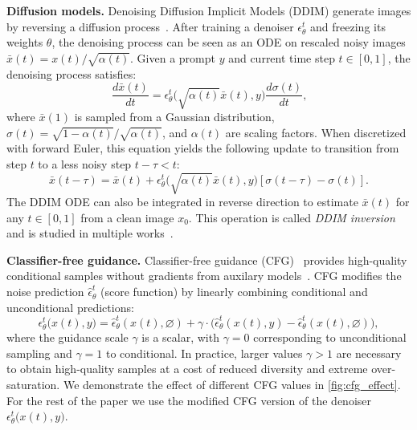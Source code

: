 
\textbf{Diffusion models.} 
Denoising Diffusion Implicit Models (DDIM) generate images by reversing a diffusion process~\cite{ho2020denoising, sohl2015deep, song2020score}. 
After training a denoiser $\epsilon_\theta^{t}$ and freezing its weights $\theta$, the denoising process can be seen as an ODE on rescaled noisy images $\bar{x}(t) = x(t) / \sqrt{\alpha(t)}$.
Given a prompt $y$ and current time step $t \in [0, 1]$, the denoising process satisfies:
\begin{equation}
    \label{eq:DDIM}
    \frac{d \bar{x}(t)}{dt} = \epsilon_\theta^{t} \bigl( \sqrt{\alpha(t)} \bar{x}(t), y\bigr) \frac{d \sigma(t)}{dt} \text{,}
\end{equation}
where $\bar x(1)$ is sampled from a Gaussian distribution, $\sigma(t) = \sqrt{1 - \alpha(t)}/\sqrt{\alpha(t)}$, and $\alpha(t)$ are scaling factors.
When discretized with forward Euler, this equation yields the following update to transition from step $t$ to a less noisy step $t - \tau < t$:
\begin{equation}
    \label{eq:DDIM_disc}
    \bar{x}(t - \tau) = 
    \bar{x}(t) + \epsilon_\theta^{t} \bigl( \sqrt{\alpha(t)} \bar{x}(t), y\bigr) 
    \left[ \sigma(t - \tau) - \sigma(t) \right] \text{.}
\end{equation}
The DDIM ODE can also be integrated in reverse direction to estimate $\bar x(t)$ for any $t\in[0, 1]$ from a clean image $x_0$.
This operation is called \textit{DDIM inversion} and is studied in multiple works~\cite{mokady2023null, miyake2023negative}.

\textbf{Classifier-free guidance.} 
Classifier-free guidance (CFG)~\cite{ho2022classifier} provides high-quality conditional samples without  gradients from auxilary models~\cite{dhariwal2021diffusion}. 
CFG modifies the noise prediction $\hat{\epsilon}_\theta^t$ (score function) 
by linearly combining conditional and unconditional predictions:
\begin{equation}
\epsilon_\theta^{t} \bigl( x(t), y\bigr) = 
 \hat{\epsilon}_\theta^{t} ( x(t), \varnothing ) + 
 \gamma \cdot \bigl(
\hat{\epsilon}_\theta^{t} ( x(t), y) - \hat{\epsilon}_\theta^{t} ( x(t), \varnothing )  
\bigr),
\end{equation}
where the guidance scale $\gamma$ is a scalar, with $\gamma = 0$ corresponding to unconditional sampling and $\gamma = 1$ to conditional. 
In practice, larger values $\gamma > 1$ are necessary to obtain high-quality samples at a cost of reduced diversity and extreme over-saturation.
We demonstrate the effect of different CFG values in \cref{fig:cfg_effect}. 
For the rest of the paper we use the modified CFG version of the denoiser $\epsilon_\theta^{t} \bigl( x(t), y\bigr)$.

